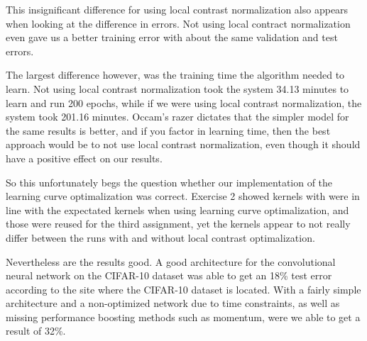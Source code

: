 This insignificant difference for using local contrast normalization also appears when looking at the difference in errors. Not using local contract normalization even gave us a better training error with about the same validation and test errors. 

The largest difference however, was the training time the algorithm needed to learn. Not using local contrast normalization took the system 34.13 minutes to learn and run 200 epochs, while if we were using local contrast normalization, the system took 201.16 minutes. Occam's razer dictates that the simpler model for the same results is better, and if you factor in learning time, then the best approach would be to not use local contrast normalization, even though it should have a positive effect on our results.

So this unfortunately begs the question whether our implementation of the learning curve optimalization was correct. Exercise 2 showed kernels with were in line with the expectated kernels when using learning curve optimalization, and those were reused for the third assignment, yet the kernels appear to not really differ between the runs with and without local contrast optimalization.

Nevertheless are the results good. A good architecture for the convolutional neural network on the CIFAR-10 dataset was able to get an 18\% test error according to the site where the CIFAR-10 dataset is located. With a fairly simple architecture and a non-optimized network due to time constraints, as well as missing performance boosting methods such as momentum, were we able to get a result of 32\%.
